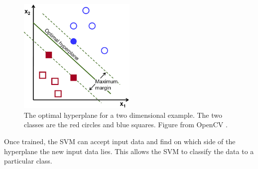\begin{figure}[ht!]
\begin{center}
\leavevmode
\includegraphics[width=0.5\textwidth]{images/svm.png}
\end{center}
\caption[Example Support Vector Machine]{The optimal hyperplane for a two dimensional example. The two classes are the red circles and blue squares. Figure from OpenCV \cite{SVM}.}
\label{SVM}
\end{figure}

Once trained, the SVM can accept input data and find on which side of the hyperplane the new input data lies. This allows the SVM to classify the data to a particular class. 

